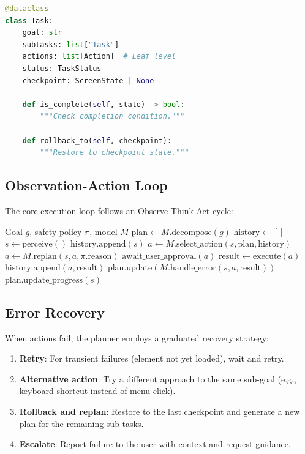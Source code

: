 \documentclass[11pt,twocolumn]{article}
\begin{document}
\begin{lstlisting}[language=Python, caption=Task decomposition structure]
@dataclass
class Task:
    goal: str
    subtasks: list["Task"]
    actions: list[Action]  # Leaf level
    status: TaskStatus
    checkpoint: ScreenState | None

    def is_complete(self, state) -> bool:
        """Check completion condition."""

    def rollback_to(self, checkpoint):
        """Restore to checkpoint state."""
\end{lstlisting}

\subsection{Observation-Action Loop}

The core execution loop follows an Observe-Think-Act cycle:

\begin{algorithm}[t]
\caption{Observation-Action Loop}
\label{alg:loop}
\begin{algorithmic}[1]
\REQUIRE Goal $g$, safety policy $\pi$, model $M$
\STATE $\text{plan} \gets M.\text{decompose}(g)$
\STATE $\text{history} \gets []$
    \STATE $s \gets \text{perceive}()$ 
    \STATE $\text{history.append}(s)$
    \STATE $a \gets M.\text{select\_action}(s, \text{plan}, \text{history})$
        \STATE $a \gets M.\text{replan}(s, a, \pi.\text{reason})$
    \ENDIF
        \STATE $\text{await\_user\_approval}(a)$
    \ENDIF
    \STATE $\text{result} \gets \text{execute}(a)$
    \STATE $\text{history.append}(a, \text{result})$
        \STATE $\text{plan.update}(M.\text{handle\_error}(s, a, \text{result}))$
    \ENDIF
    \STATE $\text{plan.update\_progress}(s)$
\ENDWHILE
\end{algorithmic}
\end{algorithm}

\subsection{Error Recovery}

When actions fail, the planner employs a graduated recovery strategy:

\begin{enumerate}[leftmargin=*]
    \item \textbf{Retry}: For transient failures (element not yet loaded), wait and retry.
    \item \textbf{Alternative action}: Try a different approach to the same sub-goal (e.g., keyboard shortcut instead of menu click).
    \item \textbf{Rollback and replan}: Restore to the last checkpoint and generate a new plan for the remaining sub-tasks.
    \item \textbf{Escalate}: Report failure to the user with context and request guidance.
\end{enumerate}
\end{document}
